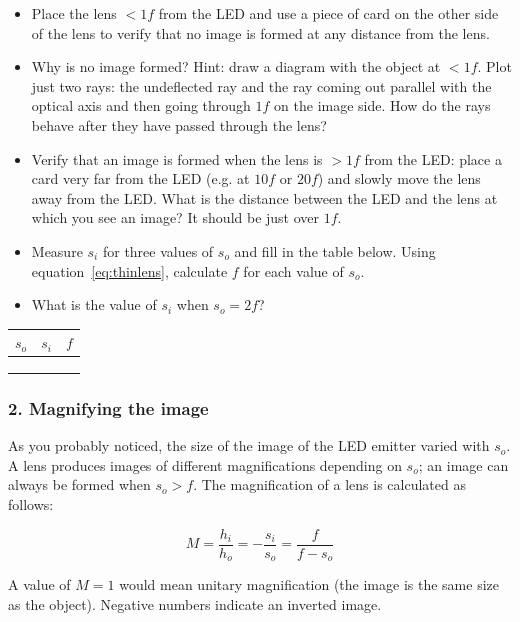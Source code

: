 \documentclass[a4paper]{report}
\begin{document}
\begin{itemize}
\item Place the lens $<1f$ from the LED and use a piece of card on the other side of the lens to verify that no image is formed at any distance from the lens.
\item Why is no image formed? 
Hint: draw a diagram with the object at $<1f$. Plot just two rays: the undeflected ray and the ray coming out parallel with the optical axis and then going through $1f$ on the image side. 
How do the rays behave after they have passed through the lens?
\item Verify that an image is formed when the lens is $>1f$ from the LED: place a card very far from the LED (e.g. at $10f$ or $20f$) and slowly move the lens away from the LED. 
What is the distance between the LED and the lens at which you see an image? 
It should be just over $1f$.
\item Measure $s_i$ for three values of $s_o$ and fill in the table below. 
Using equation~\ref{eq:thinlens}, calculate $f$ for each value of $s_o$.
\item What is the value of $s_i$ when $s_o=2f$?
\end{itemize}

\vspace{2em}
\begin{tabular}{| p{1cm} | p{1cm} | p{1cm} |}
\hline
 $s_o$  &  $s_i$  &  $f$  \\
\hline
\hline
 & & \\ \hline
 & & \\ \hline
 & & \\ \hline
\end{tabular}


\clearpage

\subsubsection{2. Magnifying the image}
As you probably noticed, the size of the image of the LED emitter varied with $s_o$.
A lens produces images of different magnifications depending on $s_o$; an image can always be formed when $s_o>f$. 
The magnification of a lens is calculated as follows:

\begin{equation}
M = \frac{h_i}{h_o} = -\frac{s_i}{s_o} = \frac{f}{f-s_o}
\label{eq:mag}
\end{equation}

A value of $M=1$ would mean unitary magnification (the image is the same size as the object). 
Negative numbers indicate an inverted image.
\end{document}
